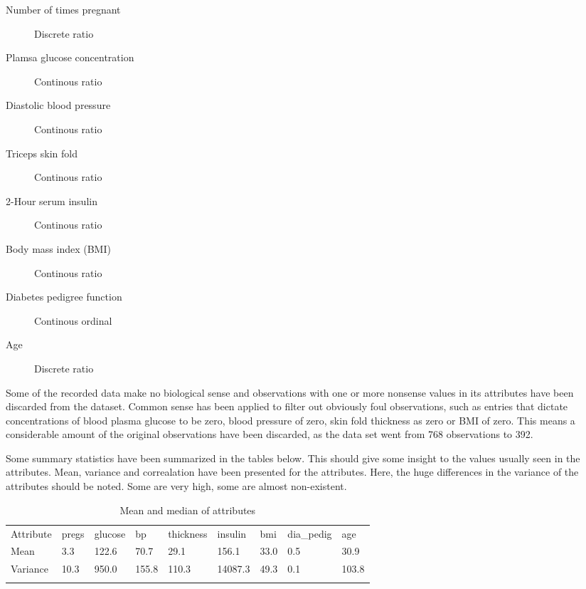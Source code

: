 \begin{description}
\item [Number of times pregnant] Discrete ratio
\item [Plamsa glucose concentration] Continous ratio
\item [Diastolic blood pressure] Continous ratio
\item [Triceps skin fold] Continous ratio
\item [2-Hour serum insulin] Continous ratio
\item [Body mass index (BMI)] Continous ratio
\item [Diabetes pedigree function] Continous ordinal
\item [Age] Discrete ratio
\end{description}


Some of the recorded data make no biological sense and observations with one or
more nonsense values in its attributes have been discarded from the dataset.
Common sense has been applied to filter out obviously foul observations, such
as entries that dictate concentrations of blood plasma glucose to be zero, blood
pressure of zero, skin fold thickness as zero or BMI of zero. This means a
considerable amount of the original observations have been discarded, as the
data set went from 768 observations to 392.
\bigskip

Some summary statistics have been summarized in the tables below. This should
give some insight to the values usually seen in the attributes. Mean, variance
and correalation have been presented for the attributes. Here, the huge differences
in the variance of the attributes should be noted. Some are very high, some are
almost non-existent.

\begin{table}[]
\centering
\caption{Mean and median of attributes}
\label{my-label}
\begin{tabular}{lllllllll}
\cline{1-1}
\multicolumn{1}{|l|}{Attribute} & pregs & glucose & bp   & thickness & insulin & bmi  & dia\_pedig & age  \\ \cline{1-1}
\multicolumn{1}{|l|}{Mean}      & 3.3   & 122.6   & 70.7 & 29.1      & 156.1   & 33.0 & 0.5        & 30.9 \\ \cline{1-1}
\multicolumn{1}{|l|}{Variance}  & 10.3     & 950.0     & 155.8   & 110.3        & 14087.3    & 49.3 & 0.1       & 103.8 \\ \cline{1-1}
                                                       &       &         &      &           &         &      &            &      \\ \hline
\end{tabular}
\end{table}

